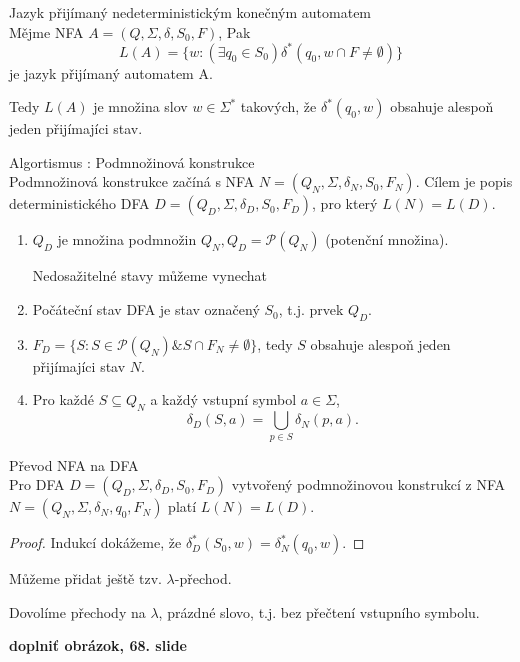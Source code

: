 \documentclass[../main.tex]{subfiles}
\begin{document}
\begin{definition}
    Jazyk přijímaný nedeterministickým konečným automatem\\

    Mějme NFA $A = (Q,\Sigma, \delta, S_0, F)$, Pak
    \[L(A) = \{w : (\exists q_0 \in S_0) \delta^*(q_0,w \cap F \neq \emptyset)\}\]
    je jazyk přijímaný automatem A.
    
    Tedy $L(A)$ je množina slov $w \in \Sigma^*$ takových, že $\delta^*(q_0,w)$ obsahuje alespoň jeden přijímajíci stav.
\end{definition}

\begin{definition}
    Algortismus : Podmnožinová konstrukce\\

    Podmnožinová konstrukce začíná s NFA $N = (Q_N,\Sigma, \delta_N, S_0, F_N)$. Cílem je popis deterministického
    DFA $D = (Q_D,\Sigma, \delta_D, S_0, F_D)$, pro který $L(N) = L(D)$.
    \begin{enumerate}
        \item $Q_D$ je množina podmnožin $Q_N,Q_D = \mathcal{P}(Q_N)$ (potenční množina).
        \begin{remark}
            Nedosažitelné stavy můžeme vynechat
        \end{remark}
        \item Počáteční stav DFA je stav označený $S_0$, t.j. prvek $Q_D$.
        \item $F_D = \{S : S\in \mathcal{P}(Q_N) \& S\cap F_N \neq \emptyset\}$, tedy $S$ obsahuje alespoň jeden přijímajíci stav $N$.
        \item Pro každé $S \subseteq Q_N$ a každý vstupní symbol $a \in \Sigma$,
        \[\delta_D(S,a) = \bigcup_{p\in S} \delta_N(p,a).\]
    \end{enumerate}
\end{definition}

\begin{theorem}
    Převod NFA na DFA\\

    Pro DFA $D = (Q_D,\Sigma, \delta_D, S_0, F_D)$ vytvořený podmnožinovou konstrukcí z NFA $N = (Q_N,\Sigma, \delta_N,q_0,F_N)$ platí $L(N) = L(D)$.
\end{theorem}
\begin{proof}
    Indukcí dokážeme, že $\delta^*_D(S_0,w) = \delta^*_N(q_0,w).$
\end{proof}

Můžeme přidat ještě tzv. $\lambda$-přechod.
\begin{definition}
    Dovolíme přechody na $\lambda$, prázdné slovo, t.j. bez přečtení vstupního symbolu.
    
    \textbf{doplniť obrázok, 68. slide}
\end{definition}
\end{document}
